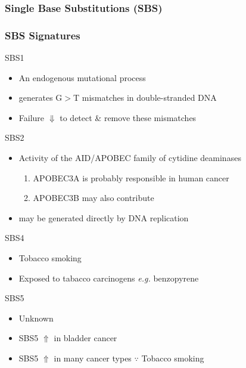 \documentclass{beamer}
\begin{document}
    \subsubsection{Single Base Substitutions (SBS)}
    \begin{frame}[allowframebreaks]
        \frametitle{SBS Signatures}

        \begin{block}{SBS1}
            \begin{itemize}
                \item An endogenous mutational process \cite{signature2}
                \item generates G$>$T mismatches in double-stranded DNA
                \item Failure $\Downarrow$ to detect \& remove these mismatches
            \end{itemize}
        \end{block}

        \begin{block}{SBS2}
            \begin{itemize}
                \item Activity of the AID/APOBEC family of cytidine deaminases \cite{signature2}
                \begin{enumerate}
                    \item APOBEC3A is probably responsible in human cancer
                    \item APOBEC3B may also contribute
                \end{enumerate}
                \item may be generated directly by DNA replication
            \end{itemize}
        \end{block}

        \begin{block}{SBS4}
            \begin{itemize}
                \item Tobacco smoking \cite{signature3}
                \item Exposed to tabacco carcinogens \textit{e.g.} benzopyrene
            \end{itemize}
        \end{block}

        \begin{block}{SBS5}
            \begin{itemize}
                \item Unknown \cite{signature3}
                \item SBS5 $\Uparrow$ in bladder cancer
                \item SBS5 $\Uparrow$ in many cancer types $\because$ Tobacco smoking
            \end{itemize}
        \end{block}


\end{frame}
\end{document}
